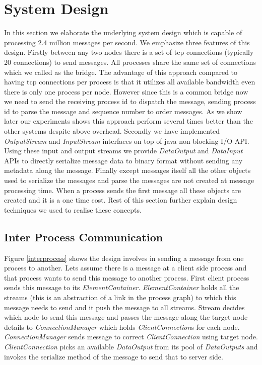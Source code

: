 \section{System Design}
In this section we elaborate the underlying system design which is capable of processing 2.4 million messages per second. We emphasize three features of this design. Firstly between any two nodes there is a set of tcp connections (typically 20 connections)  to send messages. All processes share the same set of connections which we called as the bridge. The advantage of this approach compared to having tcp connections per process is that it utilizes all available bandwidth even there is only one process per node. However since this is a common bridge now we need to send the receiving process id to dispatch the message, sending  process id to parse the message and sequence number to order messages. As we show later our experiments shows this approach perform several times better than the other systems despite above overhead. Secondly we have implemented \textit{OutputStream} and \textit{InputStream} interfaces on top of java non blocking I/O API. Using these input and output streams we provide \textit{DataOutput} and \textit{DataInput} APIs to directly 
serialize message data to binary format without sending any metadata along the message. Finally except messages itself all the other objects used to serialize the messages and parse the messages are not created at message processing time. When a process sends the first message all these objects are created and it is a one time cost. Rest of this section further explain design techniques we used to realise these concepts.
\subsection{Inter Process Communication}
Figure \ref{interprocess} shows the design involves in sending a message from one process to another. Lets assume there is a message at a client side process and that process wants to send this message to another process. First client process sends this message to its \textit{ElementContainer}. \textit{ElementContainer} holds all the streams (this is an abstraction of a link in the process graph) to which this message needs to send and it push the message to all streams. Stream decides which node to send this message and passes the message along the target node details to \textit{ConnectionManager} which holds \textit{ClientConnection}s for each node. \textit{ConnectionManager} sends message to correct \textit{ClientConnection} using target node. \textit{ClientConnection} picks an available \textit{DataOutput} from its pool of \textit{DataOutputs} and invokes the serialize method of the message to send that to server side.

